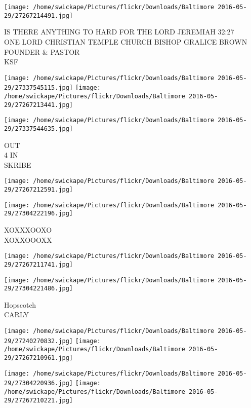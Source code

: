 \documentclass[10pt,letterpaper]{article}
\begin{document}
\vspace{0.25in}
\texttt{[image: /home/swickape/Pictures/flickr/Downloads/Baltimore 2016-05-29/27267214491.jpg]}

IS THERE ANYTHING TO HARD FOR THE LORD JEREMIAH 32:27\\
ONE LORD CHRISTIAN TEMPLE CHURCH BISHOP GRALICE BROWN FOUNDER \& PASTOR\\
KSF\\
\pagebreak

\texttt{[image: /home/swickape/Pictures/flickr/Downloads/Baltimore 2016-05-29/27337545115.jpg]}
\texttt{[image: /home/swickape/Pictures/flickr/Downloads/Baltimore 2016-05-29/27267213441.jpg]}

\vspace{0.25in}
\texttt{[image: /home/swickape/Pictures/flickr/Downloads/Baltimore 2016-05-29/27337544635.jpg]}

OUT\\
4 IN\\
SKRIBE\\
\pagebreak

\texttt{[image: /home/swickape/Pictures/flickr/Downloads/Baltimore 2016-05-29/27267212591.jpg]}

\vspace{0.25in}
\texttt{[image: /home/swickape/Pictures/flickr/Downloads/Baltimore 2016-05-29/27304222196.jpg]}

XOXXXOOXO\\
XOXXOOOXX\\
\pagebreak

\texttt{[image: /home/swickape/Pictures/flickr/Downloads/Baltimore 2016-05-29/27267211741.jpg]}

\vspace{0.25in}
\texttt{[image: /home/swickape/Pictures/flickr/Downloads/Baltimore 2016-05-29/27304221486.jpg]}

Hopscotch\\
CARLY\\
\pagebreak

\texttt{[image: /home/swickape/Pictures/flickr/Downloads/Baltimore 2016-05-29/27240270832.jpg]}
\texttt{[image: /home/swickape/Pictures/flickr/Downloads/Baltimore 2016-05-29/27267210961.jpg]}

\texttt{[image: /home/swickape/Pictures/flickr/Downloads/Baltimore 2016-05-29/27304220936.jpg]}
\texttt{[image: /home/swickape/Pictures/flickr/Downloads/Baltimore 2016-05-29/27267210221.jpg]}
\end{document}
